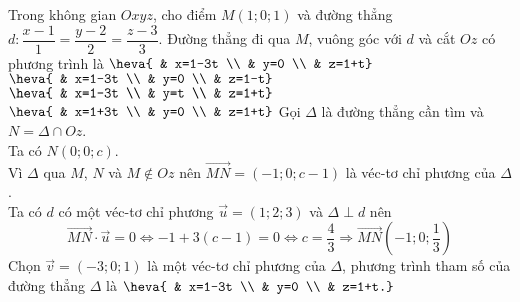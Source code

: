 \begin{ex}%
	Trong không gian $Oxyz$, cho điểm $M(1;0;1)$ và đường thẳng $d\colon \dfrac{x-1}{1}=\dfrac{y-2}{2}=\dfrac{z-3}{3}$. Đường thẳng đi qua $M$, vuông góc với $d$ và cắt $Oz$ có phương trình là
	\choice
	{\True $\heva{ & x=1-3t \\ & y=0 \\ & z=1+t}$}
	{$\heva{ & x=1-3t \\ & y=0 \\ & z=1-t}$}
	{$\heva{ & x=1-3t \\ & y=t \\ & z=1+t}$}
	{$\heva{ & x=1+3t \\ & y=0 \\ & z=1+t}$}
	\loigiai
	{
		Gọi $\Delta$ là đường thẳng cần tìm và $N=\Delta \cap Oz$.\\
		Ta có $N(0;0;c)$. \\
		Vì $\Delta$ qua $M$, $N$ và $M\notin Oz$ nên $\overrightarrow{MN}=(-1;0;c-1)$ là véc-tơ chỉ phương của $\Delta$.\\
		Ta có $d$ có một véc-tơ chỉ phương $\overrightarrow{u}=(1;2;3)$ và $\Delta \perp d$ nên
		\[\overrightarrow{MN}\cdot\overrightarrow{u}=0 \Leftrightarrow -1+3(c-1)=0 \Leftrightarrow c=\dfrac{4}{3} \Rightarrow \overrightarrow{MN}\left(-1;0;\dfrac{1}{3}\right)\]
		Chọn $\overrightarrow{v}=(-3;0;1)$ là một véc-tơ chỉ phương của $\Delta$, phương trình tham số của đường thẳng $\Delta$ là $\heva{ & x=1-3t \\ & y=0 \\ & z=1+t.}$
	}
\end{ex}

